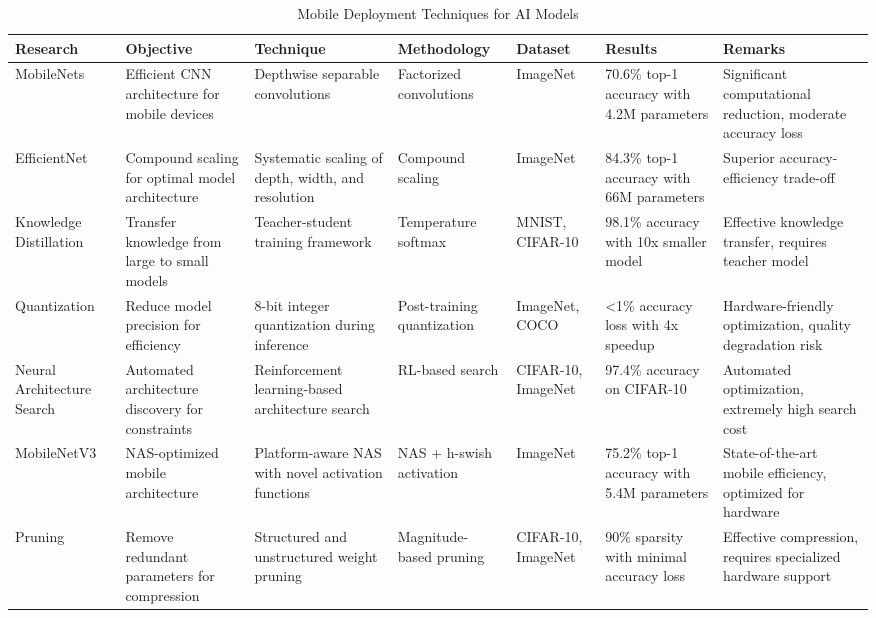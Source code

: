 \documentclass[12pt,a4paper]{report}
\begin{document}
\newpage
\begin{landscape}
\begin{table}[H]
\centering
\caption{Mobile Deployment Techniques for AI Models}
\label{tab:mobile_deployment_techniques}
\small
\begin{tabular}{|p{3cm}|p{3.5cm}|p{3cm}|p{2.5cm}|p{2.5cm}|p{3cm}|p{3.5cm}|}
\hline
\textbf{Research} & \textbf{Objective} & \textbf{Technique} & \textbf{Methodology} & \textbf{Dataset} & \textbf{Results} & \textbf{Remarks} \\
\hline
MobileNets \cite{howard2017mobilenets} & Efficient CNN architecture for mobile devices & Depthwise separable convolutions & Factorized convolutions & ImageNet & 70.6\% top-1 accuracy with 4.2M parameters & Significant computational reduction, moderate accuracy loss \\
\hline
EfficientNet \cite{tan2019efficientnet} & Compound scaling for optimal model architecture & Systematic scaling of depth, width, and resolution & Compound scaling & ImageNet & 84.3\% top-1 accuracy with 66M parameters & Superior accuracy-efficiency trade-off \\
\hline
Knowledge Distillation \cite{hinton2015distilling} & Transfer knowledge from large to small models & Teacher-student training framework & Temperature softmax & MNIST, CIFAR-10 & 98.1\% accuracy with 10x smaller model & Effective knowledge transfer, requires teacher model \\
\hline
Quantization \cite{jacob2018quantization} & Reduce model precision for efficiency & 8-bit integer quantization during inference & Post-training quantization & ImageNet, COCO & <1\% accuracy loss with 4x speedup & Hardware-friendly optimization, quality degradation risk \\
\hline
Neural Architecture Search \cite{zoph2018learning} & Automated architecture discovery for constraints & Reinforcement learning-based architecture search & RL-based search & CIFAR-10, ImageNet & 97.4\% accuracy on CIFAR-10 & Automated optimization, extremely high search cost \\
\hline
MobileNetV3 \cite{howard2019searching} & NAS-optimized mobile architecture & Platform-aware NAS with novel activation functions & NAS + h-swish activation & ImageNet & 75.2\% top-1 accuracy with 5.4M parameters & State-of-the-art mobile efficiency, optimized for hardware \\
\hline
Pruning \cite{louizos2018learning} & Remove redundant parameters for compression & Structured and unstructured weight pruning & Magnitude-based pruning & CIFAR-10, ImageNet & 90\% sparsity with minimal accuracy loss & Effective compression, requires specialized hardware support \\
\hline
\end{tabular}
\end{table}
\end{landscape}
\end{document}
